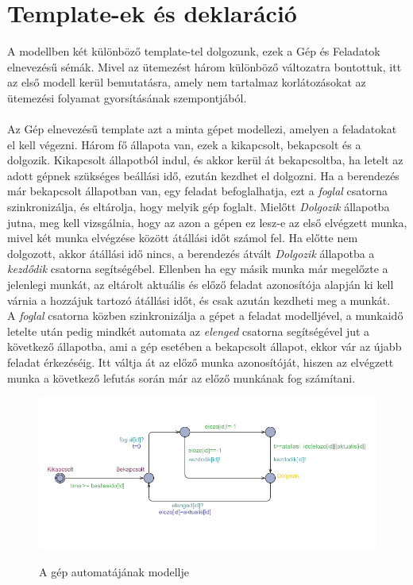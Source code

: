 \documentclass {report}
\begin{document}
    \section{Template-ek és deklaráció}
    A modellben két különböző template-tel dolgozunk, ezek a Gép és Feladatok elnevezésű sémák. Mivel az ütemezést három különböző változatra bontottuk, itt az első modell kerül bemutatásra, amely nem tartalmaz korlátozásokat az ütemezési folyamat gyorsításának szempontjából.\\\\
    Az Gép elnevezésű template azt a minta gépet modellezi, amelyen a feladatokat el kell végezni. Három fő állapota van, ezek a kikapcsolt, bekapcsolt és a dolgozik. Kikapcsolt állapotból indul, és akkor kerül át bekapcsoltba, ha letelt az adott gépnek szükséges beállási idő, ezután kezdhet el dolgozni.  Ha a berendezés már bekapcsolt állapotban van, egy feladat befoglalhatja, ezt a \emph{foglal} csatorna szinkronizálja, és eltárolja, hogy melyik gép foglalt. Mielőtt \emph{Dolgozik} állapotba jutna, meg kell vizsgálnia, hogy az azon a gépen ez lesz-e az első elvégzett munka, mivel két munka elvégzése között átállási időt számol fel. Ha előtte nem dolgozott, akkor átállási idő nincs, a berendezés átvált \emph{Dolgozik} állapotba a \emph{kezdődik} csatorna segítségébel. Ellenben ha egy másik munka már megelőzte a jelenlegi munkát, az eltárolt aktuális és előző feladat azonosítója alapján ki kell várnia a hozzájuk tartozó átállási időt, és csak azután kezdheti meg a munkát. \\
    A \emph{foglal} csatorna közben szinkronizálja a gépet a feladat modelljével, a munkaidő letelte után pedig mindkét automata az \emph{elenged} csatorna segítségével jut a következő állapotba, ami a gép esetében a bekapcsolt állapot, ekkor vár az újabb feladat érkezéséig. Itt váltja át az előző munka azonosítóját, hiszen az elvégzett munka a következő lefutás során már az előző munkának fog számítani. 
    \begin{figure}[htpb]
    \begin{center}
   \includegraphics[width=12cm]{gep}\\
    \caption{A gép automatájának modellje}
    \end{center}
    \end{figure}\\\\\\
\end{document}

